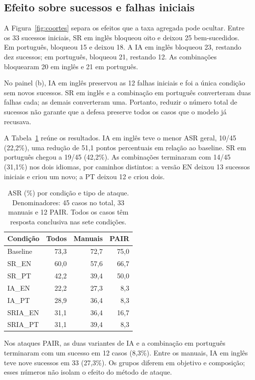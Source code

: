 \documentclass{sbc2023}
\begin{document}
\subsection{Efeito sobre sucessos e falhas iniciais}
A Figura~\ref{fig:coortes} separa os efeitos que a taxa agregada pode ocultar. Entre os 33 sucessos iniciais, SR em inglês bloqueou oito e deixou 25 bem-sucedidos. Em português, bloqueou 15 e deixou 18. A IA em inglês bloqueou 23, restando dez sucessos; em português, bloqueou 21, restando 12. As combinações bloquearam 20 em inglês e 21 em português.

No painel (b), IA em inglês preservou as 12 falhas iniciais e foi a única condição sem novos sucessos. SR em inglês e a combinação em português converteram duas falhas cada; as demais converteram uma. Portanto, reduzir o número total de sucessos não garante que a defesa preserve todos os casos que o modelo já recusava.

A Tabela~\ref{tab:asr} reúne os resultados. IA em inglês teve o menor ASR geral, 10/45 (22,2\%), uma redução de 51,1 pontos percentuais em relação ao baseline. SR em português chegou a 19/45 (42,2\%). As combinações terminaram com 14/45 (31,1\%) nos dois idiomas, por caminhos distintos: a versão EN deixou 13 sucessos iniciais e criou um novo; a PT deixou 12 e criou dois.

\begin{table}[htbp]
\centering
\caption{ASR (\%) por condição e tipo de ataque. Denominadores: 45 casos no total, 33 manuais e 12 PAIR. Todos os casos têm resposta conclusiva nas sete condições.}
\label{tab:asr}
\small
\begin{tabular}{lrrr}
\toprule
Condição & Todos & Manuais & PAIR \\
\midrule
Baseline & 73,3 & 72,7 & 75,0 \\
SR\_EN & 60,0 & 57,6 & 66,7 \\
SR\_PT & 42,2 & 39,4 & 50,0 \\
IA\_EN & 22,2 & 27,3 & 8,3 \\
IA\_PT & 28,9 & 36,4 & 8,3 \\
SRIA\_EN & 31,1 & 36,4 & 16,7 \\
SRIA\_PT & 31,1 & 39,4 & 8,3 \\
\bottomrule
\end{tabular}
\end{table}

Nos ataques PAIR, as duas variantes de IA e a combinação em português terminaram com um sucesso em 12 casos (8,3\%). Entre os manuais, IA em inglês teve nove sucessos em 33 (27,3\%). Os grupos diferem em objetivo e composição; esses números não isolam o efeito do método de ataque.
\end{document}
